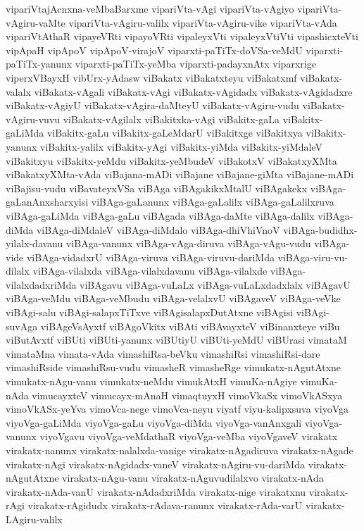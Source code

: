 {vipariVtajAcnxna-veMbaBarxme
vipariVta-vAgi
vipariVta-vAgiyo
vipariVta-vAgiru-vaMte
vipariVta-vAgiru-valilx
vipariVta-vAgiru-vike
vipariVta-vAda
vipariVtAthaR
vipayeVRti
vipayoVRti
vipaleyxVti
vipaleyxVtiVti
vipashicxteVti
vipApaH
vipApoV
vipApoV-virajoV
viparxti-paTiTx-doVSa-veMdU
viparxti-paTiTx-yanunx
viparxti-paTiTx-yeMba
viparxti-padayxnAtx
viparxrige
viperxVBayxH
vibUrx-yAdasw
viBakatx
viBakatxteyu
viBakatxmf
viBakatx-valalx
viBakatx-vAgali
viBakatx-vAgi
viBakatx-vAgidadx
viBakatx-vAgidadxre
viBakatx-vAgiyU
viBakatx-vAgira-daMteyU
viBakatx-vAgiru-vudu
viBakatx-vAgiru-vuvu
viBakatx-vAgilalx
viBakitxka-vAgi
viBakitx-gaLa
viBakitx-gaLiMda
viBakitx-gaLu
viBakitx-gaLeMdarU
viBakitxge
viBakitxya
viBakitx-yanunx
viBakitx-yalilx
viBakitx-yAgi
viBakitx-yiMda
viBakitx-yiMdaleV
viBakitxyu
viBakitx-yeMdu
viBakitx-yeMbudeV
viBakotxV
viBakatxyXMta
viBakatxyXMta-vAda
viBajana-mADi
viBajane
viBajane-giMta
viBajane-mADi
viBajisu-vudu
viBavateyxVSa
viBAga
viBAgakikxMtalU
viBAgakekx
viBAga-gaLanAnxsharxyisi
viBAga-gaLanunx
viBAga-gaLalilx
viBAga-gaLalilxruva
viBAga-gaLiMda
viBAga-gaLu
viBAgada
viBAga-daMte
viBAga-dalilx
viBAga-diMda
viBAga-diMdaleV
viBAga-diMdalo
viBAga-dhiVhiVnoV
viBAga-budidhx-yilalx-davanu
viBAga-vanunx
viBAga-vAga-diruva
viBAga-vAgu-vudu
viBAga-vide
viBAga-vidadxrU
viBAga-viruva
viBAga-viruvu-dariMda
viBAga-viru-vu-dilalx
viBAga-vilalxda
viBAga-vilalxdavanu
viBAga-vilalxde
viBAga-vilalxdadxriMda
viBAgavu
viBAga-vuLaLx
viBAga-vuLaLxdadxlalx
viBAgavU
viBAga-veMdu
viBAga-veMbudu
viBAga-velalxvU
viBAgaveV
viBAga-veVke
viBAgi-salu
viBAgi-salapxTiTxve
viBAgisalapxDutAtxne
viBAgisi
viBAgi-suvAga
viBAgeVsAyxtf
viBAgoVkitx
viBAti
viBAvayxteV
viBinanxteye
viBu
viButAvxtf
viBUti
viBUti-yanunx
viBUtiyU
viBUti-yeMdU
viBUrasi
vimataM
vimataMna
vimata-vAda
vimashiRsa-beVku
vimashiRsi
vimashiRsi-dare
vimashiRside
vimashiRsu-vudu
vimasheR
vimasheRge
vimukatx-nAgutAtxne
vimukatx-nAgu-vanu
vimukatx-neMdu
vimukAtxH
vimuKa-nAgiye
vimuKa-nAda
vimucayxteV
vimucayx-mAnaH
vimaqtuyxH
vimoVkaSx
vimoVkASxya
vimoVkASx-yeYva
vimoVca-nege
vimoVca-neyu
viyatf
viyu-kalipxsuva
viyoVga
viyoVga-gaLiMda
viyoVga-gaLu
viyoVga-diMda
viyoVga-vanAnxgali
viyoVga-vanunx
viyoVgavu
viyoVga-veMdathaR
viyoVga-veMba
viyoVgaveV
virakatx
virakatx-nanunx
virakatx-nalalxda-vanige
virakatx-nAgadiruva
virakatx-nAgade
virakatx-nAgi
virakatx-nAgidadx-vaneV
virakatx-nAgiru-vu-dariMda
virakatx-nAgutAtxne
virakatx-nAgu-vanu
virakatx-nAguvudilalxvo
virakatx-nAda
virakatx-nAda-vanU
virakatx-nAdadxriMda
virakatx-nige
virakatxnu
virakatx-rAgi
virakatx-rAgidudx
virakatx-rAdava-ranunx
virakatx-rAda-varU
virakatx-LAgiru-valilx
}
